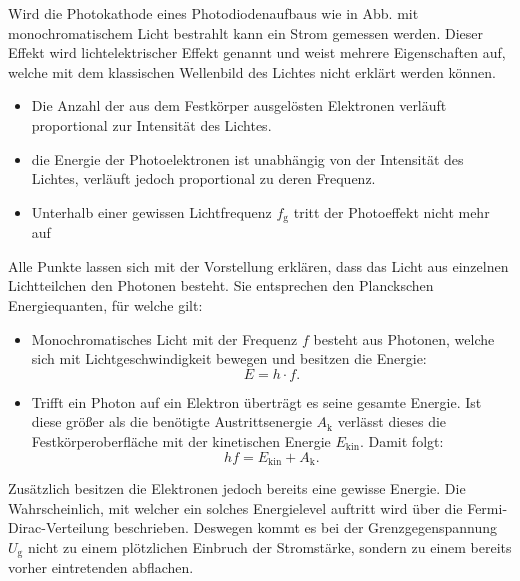  Wird die Photokathode eines Photodiodenaufbaus wie in Abb. \cite{fig:photodiode}
 mit monochromatischem Licht bestrahlt kann ein Strom gemessen werden.
 Dieser Effekt wird lichtelektrischer Effekt genannt und weist mehrere Eigenschaften auf, welche mit dem
 klassischen Wellenbild des Lichtes nicht erklärt werden können.
\begin{itemize}
  \item Die Anzahl der aus dem Festkörper ausgelösten Elektronen verläuft
  proportional zur Intensität des Lichtes.
  \item die Energie der Photoelektronen ist unabhängig von der Intensität des
  Lichtes, verläuft jedoch proportional zu deren Frequenz.
  \item Unterhalb einer gewissen Lichtfrequenz $f_\text{g}$ tritt der Photoeffekt nicht mehr auf
\end{itemize}
Alle Punkte lassen sich mit der Vorstellung erklären, dass das Licht aus einzelnen
Lichtteilchen den Photonen besteht. Sie entsprechen den Planckschen Energiequanten,
für welche gilt:
\begin{itemize}
  \item Monochromatisches Licht mit der Frequenz $f$ besteht aus Photonen,
  welche sich mit Lichtgeschwindigkeit bewegen und besitzen die Energie:
  \begin{equation}
    E = h \cdot f\text{.}\label{ITSAPLANCK}
    \end{equation}
    \item Trifft ein Photon auf ein Elektron überträgt es seine gesamte Energie.
    Ist diese größer als die benötigte Austrittsenergie $A_\text{k}$ verlässt
    dieses die Festkörperoberfläche mit der kinetischen Energie $E_\text{kin}$.
    Damit folgt:
    \begin{equation}
      h f = E_\text{kin} +A_\text{k}\text{.}\label{STEVE0ne:---3}
    \end{equation}
\end{itemize}
Zusätzlich besitzen die Elektronen jedoch bereits eine gewisse Energie. Die Wahrscheinlich,
mit welcher ein solches Energielevel auftritt wird über die Fermi-Dirac-Verteilung
beschrieben. Deswegen kommt es bei der Grenzgegenspannung $U_\text{g}$ nicht zu
einem plötzlichen Einbruch der Stromstärke, sondern zu einem bereits vorher eintretenden abflachen.

